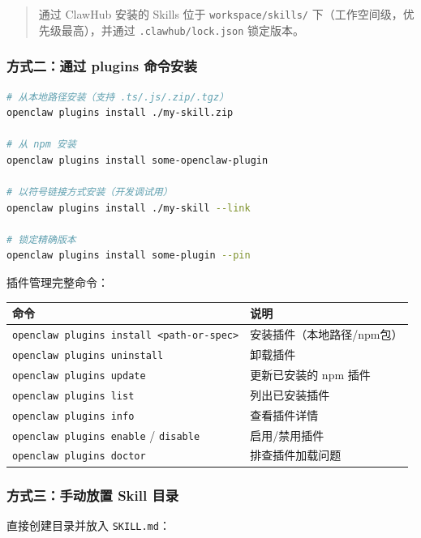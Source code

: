 \begin{quote}
通过 ClawHub 安装的 Skills 位于 \texttt{workspace/skills/} 下（工作空间级，优先级最高），并通过 \texttt{.clawhub/lock.json} 锁定版本。
\end{quote}

\subsubsection{方式二：通过 plugins 命令安装}


\begin{lstlisting}[language=bash]
# 从本地路径安装（支持 .ts/.js/.zip/.tgz）
openclaw plugins install ./my-skill.zip

# 从 npm 安装
openclaw plugins install some-openclaw-plugin

# 以符号链接方式安装（开发调试用）
openclaw plugins install ./my-skill --link

# 锁定精确版本
openclaw plugins install some-plugin --pin
\end{lstlisting}

插件管理完整命令：

\begin{table}[h]
\centering
\small
\begin{tabular}{|l|p{}|}
\hline
命令 & 说明 \\
\hline
\texttt{openclaw plugins install <path-or-spec>} & 安装插件（本地路径/npm包） \\
\hline
\texttt{openclaw plugins uninstall} & 卸载插件 \\
\hline
\texttt{openclaw plugins update} & 更新已安装的 npm 插件 \\
\hline
\texttt{openclaw plugins list} & 列出已安装插件 \\
\hline
\texttt{openclaw plugins info} & 查看插件详情 \\
\hline
\texttt{openclaw plugins enable} / \texttt{disable} & 启用/禁用插件 \\
\hline
\texttt{openclaw plugins doctor} & 排查插件加载问题 \\
\hline
\end{tabular}
\end{table}

\subsubsection{方式三：手动放置 Skill 目录}


直接创建目录并放入 \texttt{SKILL.md}：

